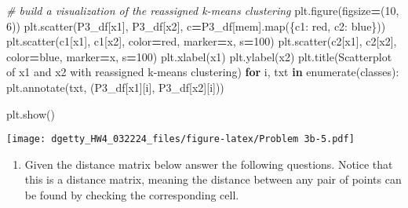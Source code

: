 \documentclass[
]{article}
\newenvironment{Shaded}{\begin{snugshade}}{\end{snugshade}}
\newcommand{\BuiltInTok}[1]{#1}
\newcommand{\CommentTok}[1]{\textcolor[rgb]{0.56,0.35,0.01}{\textit{#1}}}
\newcommand{\ControlFlowTok}[1]{\textcolor[rgb]{0.13,0.29,0.53}{\textbf{#1}}}
\newcommand{\DecValTok}[1]{\textcolor[rgb]{0.00,0.00,0.81}{#1}}
\newcommand{\KeywordTok}[1]{\textcolor[rgb]{0.13,0.29,0.53}{\textbf{#1}}}
\newcommand{\NormalTok}[1]{#1}
\newcommand{\OperatorTok}[1]{\textcolor[rgb]{0.81,0.36,0.00}{\textbf{#1}}}
\newcommand{\StringTok}[1]{\textcolor[rgb]{0.31,0.60,0.02}{#1}}
\providecommand{\tightlist}{%
  \setlength{\itemsep}{0pt}\setlength{\parskip}{0pt}}
\begin{document}
\begin{Shaded}
\begin{Highlighting}[]
\CommentTok{\# build a visualization of the reassigned k{-}means clustering}
\NormalTok{plt.figure(figsize}\OperatorTok{=}\NormalTok{(}\DecValTok{10}\NormalTok{, }\DecValTok{6}\NormalTok{))}
\NormalTok{plt.scatter(P3\_df[}\StringTok{\textquotesingle{}x1\textquotesingle{}}\NormalTok{], P3\_df[}\StringTok{\textquotesingle{}x2\textquotesingle{}}\NormalTok{], c}\OperatorTok{=}\NormalTok{P3\_df[}\StringTok{\textquotesingle{}mem\textquotesingle{}}\NormalTok{].}\BuiltInTok{map}\NormalTok{(\{}\StringTok{\textquotesingle{}c1\textquotesingle{}}\NormalTok{: }\StringTok{\textquotesingle{}red\textquotesingle{}}\NormalTok{, }\StringTok{\textquotesingle{}c2\textquotesingle{}}\NormalTok{: }\StringTok{\textquotesingle{}blue\textquotesingle{}}\NormalTok{\}))}
\NormalTok{plt.scatter(c1[}\StringTok{\textquotesingle{}x1\textquotesingle{}}\NormalTok{], c1[}\StringTok{\textquotesingle{}x2\textquotesingle{}}\NormalTok{], color}\OperatorTok{=}\StringTok{\textquotesingle{}red\textquotesingle{}}\NormalTok{, marker}\OperatorTok{=}\StringTok{\textquotesingle{}x\textquotesingle{}}\NormalTok{, s}\OperatorTok{=}\DecValTok{100}\NormalTok{)}
\NormalTok{plt.scatter(c2[}\StringTok{\textquotesingle{}x1\textquotesingle{}}\NormalTok{], c2[}\StringTok{\textquotesingle{}x2\textquotesingle{}}\NormalTok{], color}\OperatorTok{=}\StringTok{\textquotesingle{}blue\textquotesingle{}}\NormalTok{, marker}\OperatorTok{=}\StringTok{\textquotesingle{}x\textquotesingle{}}\NormalTok{, s}\OperatorTok{=}\DecValTok{100}\NormalTok{)}
\NormalTok{plt.xlabel(}\StringTok{\textquotesingle{}x1\textquotesingle{}}\NormalTok{)}
\NormalTok{plt.ylabel(}\StringTok{\textquotesingle{}x2\textquotesingle{}}\NormalTok{)}
\NormalTok{plt.title(}\StringTok{\textquotesingle{}Scatterplot of x1 and x2 with reassigned k{-}means clustering\textquotesingle{}}\NormalTok{)}
\ControlFlowTok{for}\NormalTok{ i, txt }\KeywordTok{in} \BuiltInTok{enumerate}\NormalTok{(classes):}
\NormalTok{    plt.annotate(txt, (P3\_df[}\StringTok{\textquotesingle{}x1\textquotesingle{}}\NormalTok{][i], P3\_df[}\StringTok{\textquotesingle{}x2\textquotesingle{}}\NormalTok{][i]))}
    
\NormalTok{plt.show()}
\end{Highlighting}
\end{Shaded}

\texttt{[image: dgetty\_HW4\_032224\_files/figure-latex/Problem 3b-5.pdf]}

\begin{enumerate}
\def\labelenumi{\arabic{enumi}.}
\setcounter{enumi}{3}
\tightlist
\item
  Given the distance matrix below answer the following questions. Notice
  that this is a distance matrix, meaning the distance between any pair
  of points can be found by checking the corresponding cell.
\end{enumerate}
\end{document}
